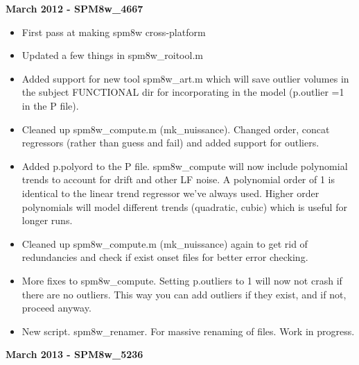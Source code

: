\documentclass[12pt]{article}
\begin{document}
\noindent
\textbf{March 2012 - SPM8w\_4667}
\begin{itemize}
	\item First pass at making spm8w cross-platform
	\item Updated a few things in spm8w\_roitool.m
	\item Added support for new tool spm8w\_art.m which will save outlier volumes in the subject FUNCTIONAL dir for incorporating in the model (p.outlier =1 in the P file).
	\item Cleaned up spm8w\_compute.m (mk\_nuissance). Changed order, concat regressors (rather than guess and fail) and added support for outliers. 
	\item Added p.polyord to the P file. spm8w\_compute will now include polynomial trends to account for drift and other LF noise. A polynomial order of 1 is identical to the linear trend regressor we’ve always used. Higher order polynomials will model different trends (quadratic, cubic) which is useful for longer runs. 
	\item Cleaned up spm8w\_compute.m (mk\_nuissance) again to get rid of redundancies and check if exist onset files for better error checking. 
	\item More fixes to spm8w\_compute. Setting p.outliers to 1 will now not crash if there are no outliers. This way you can add outliers if they exist, and if not, proceed anyway.
	\item New script. spm8w\_renamer. For massive renaming of files. Work in progress.
\end{itemize}
\noindent
\textbf{March 2013 - SPM8w\_5236}
\end{document}

